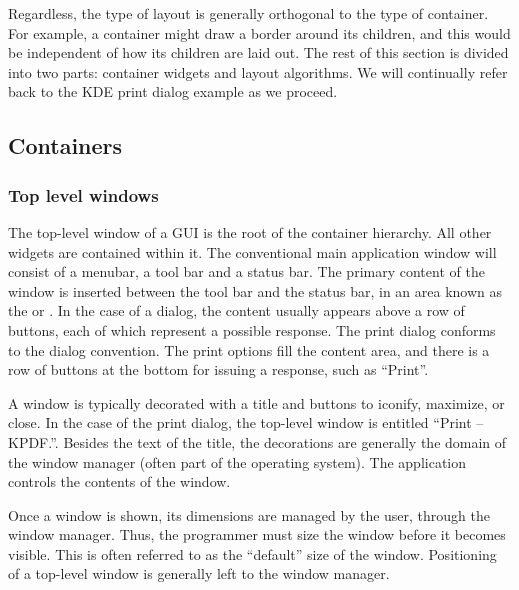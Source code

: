 Regardless, the type of layout is generally orthogonal to the type of
container. For example, a container might draw a border around its
children, and this would be independent of how its children are laid
out.  The rest of this section is divided into two parts: container
widgets and layout algorithms. We will continually refer back to the
KDE print dialog example as we proceed.


\subsection{Containers}
\label{sec:containers}

\subsubsection{Top level windows}
\label{sec:GUI:top-level-windows}

The top-level window of a GUI is the root of the container
hierarchy. All other widgets are contained within it.  The
conventional main application window will consist of a menubar, a
tool bar and a status bar. The primary content of the window is
inserted between the tool bar and the status bar, in an area known as
the  or . In the case of a
dialog, the content usually appears above a row of buttons, each of
which represent a possible response. The print dialog conforms to the
dialog convention. The print options fill the content area, and there
is a row of buttons at the bottom for issuing a response, such as
``Print''.

A window is typically decorated with a title and buttons to iconify,
maximize, or close. In the case of the print dialog, the top-level
window is entitled ``Print -- KPDF.''. Besides the text of the title,
the decorations are generally the domain of the window manager (often
part of the operating system). The application controls the contents
of the window.

Once a window is shown, its dimensions are managed by the user,
through the window manager. Thus, the programmer must size the window
before it becomes visible. This is often referred to as the
``default'' size of the window. Positioning of a top-level window is
generally left to the window manager.

